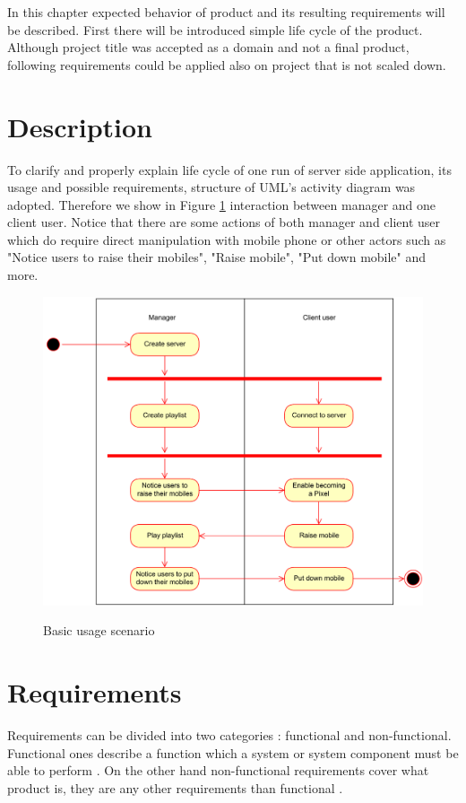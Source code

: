 In this chapter expected behavior of product and its resulting requirements will be described. 
First there will be introduced simple life cycle of the product.
Although project title was accepted as a domain and not a final product, following requirements could be applied also on project that is not scaled down.

\section{Description}
To clarify and properly explain life cycle of one run of server side application, its usage and possible requirements, structure of UML's activity diagram \cite{Dumas:2001:UAD:647245.719456} was adopted. 
Therefore we show in Figure \ref{img:activity_diagram} interaction between manager and one client user.
Notice that there are some actions of both manager and client user which do require direct manipulation with mobile phone or other actors such as "Notice users to raise their mobiles", "Raise mobile", "Put down mobile" and more.

\begin{figure}[h!]
    \begin{center}
    \includegraphics[scale=0.4]{images/activity_diagram.pdf}
    \label{img:activity_diagram}
    \caption{Basic usage scenario}
    \end{center}
\end{figure}

\section{Requirements} \label{txt:requirements}
Requirements can be divided into two categories \cite[p.~19]{ntnu_req}: functional and non-functional. 
Functional ones describe a function which a system or system component must be able to perform \cite[p.~35]{ieee610.12:1990}.
On the other hand non-functional requirements cover what product is, they are any other requirements than functional  \cite[p.~20]{ntnu_req}.


